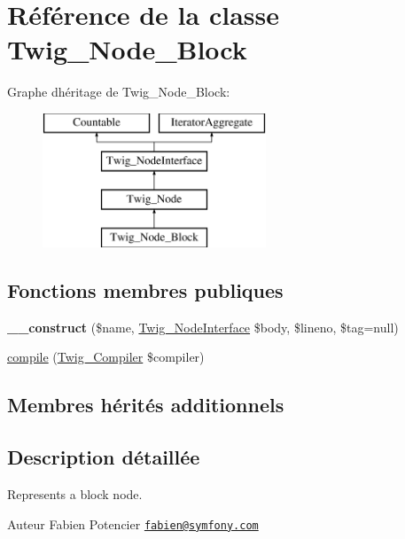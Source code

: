 \hypertarget{class_twig___node___block}{}\section{Référence de la classe Twig\+\_\+\+Node\+\_\+\+Block}
\label{class_twig___node___block}
Graphe d\textquotesingle{}héritage de Twig\+\_\+\+Node\+\_\+\+Block\+:\begin{figure}[H]
\begin{center}
\leavevmode
\includegraphics[height=4.000000cm]{class_twig___node___block}
\end{center}
\end{figure}
\subsection*{Fonctions membres publiques}
\begin{DoxyCompactItemize}
\item 
{\bfseries \+\_\+\+\_\+construct} (\$name, \hyperlink{interface_twig___node_interface}{Twig\+\_\+\+Node\+Interface} \$body, \$lineno, \$tag=null)\hypertarget{class_twig___node___block_a6edceecc26fb2d0e0ba4cc3aeca3aa77}{}\label{class_twig___node___block_a6edceecc26fb2d0e0ba4cc3aeca3aa77}

\item 
\hyperlink{class_twig___node___block_a4e0faa87c3fae583620b84d3607085da}{compile} (\hyperlink{class_twig___compiler}{Twig\+\_\+\+Compiler} \$compiler)
\end{DoxyCompactItemize}
\subsection*{Membres hérités additionnels}


\subsection{Description détaillée}
Represents a block node.

\begin{DoxyAuthor}{Auteur}
Fabien Potencier \href{mailto:fabien@symfony.com}{\tt fabien@symfony.\+com} 
\end{DoxyAuthor}


